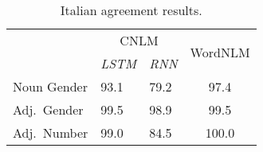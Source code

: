 \begin{table}[t]
  \begin{small}
    \begin{center}
      \begin{tabular}{l|ll|c}
        & \multicolumn{2}{c|}{CNLM} & \multicolumn{1}{c}{\multirow{2}{*}{WordNLM}}\\
        &\emph{LSTM}&\emph{RNN} &  \\ \hline
        Noun Gender & 93.1  & 79.2 & 97.4\\
        Adj.~Gender & 99.5 & 98.9 & 99.5\\
        Adj.~Number & 99.0 & 84.5 & 100.0\\
%
      \end{tabular}
    \end{center}
  \end{small}
  \caption{\label{tab:ital-agr-results} Italian agreement results.} %
\end{table}

